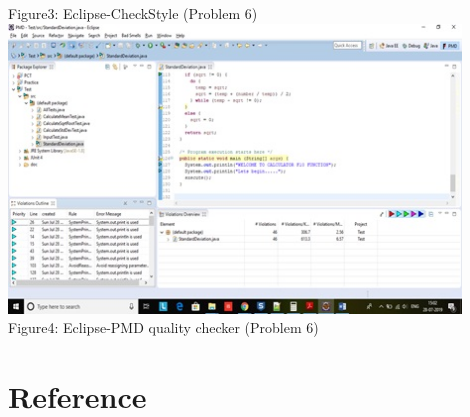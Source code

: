 \documentclass[a4paper,12pt]{article}
\begin{document}
\begin{titlepage}
Figure3: Eclipse-CheckStyle (Problem 6)\\
\newline
\newline
\includegraphics[width=12.0cm]{PMD-SC.jpg}\\
Figure4: Eclipse-PMD quality checker (Problem 6)\\

\newpage
\section{Reference}




\end{titlepage}
\end{document}
